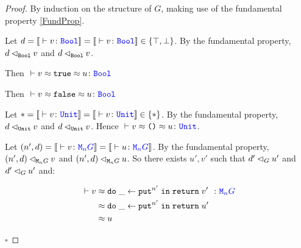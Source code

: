 \documentclass{Report}
\begin{document}
\begin{proof}
    By induction on the structure of $G$, making use of the fundamental property \ref{FundProp}.

    Let $d=\deno{\ztyperelation{v}{\B}}=\deno{\ztyperelation{v}{\B}}\in \{\top, \bot\}$. By the fundamental property, $d \lhd_{\texttt{Bool}} v$  and $d \lhd_{\texttt{Bool}} v$.

    Then $\zberelation{v\beequiv\t}{u}{\B}$

    
    Then $\zberelation{v\beequiv\f}{u}{\B}$

    Let $\singleton=\deno{\ztyperelation{v}{\U}}=\deno{\ztyperelation{v}{\U}}\in \{\singleton\}$. By the fundamental property, $d \lhd_{\texttt{Unit}} v$  and $d \lhd_{\texttt{Unit}} v$. Hence $\zberelation{v\beequiv\u}{u}{\U}$.

    \case{\teffect}

    Let $(n', d) = \deno{\ztyperelation{v}{\M{n}{G}}} = \deno{\ztyperelation{u}{\M{n}{G}}}$. By the fundamental property, $(n', d) \lhd_{\texttt{M}_{n}{G}} v$ and $(n', d) \lhd_{\texttt{M}_{n}{G}} u$. So there exists $u', v'$ such that $d' \lhd_{G} u'$ and $d' \lhd_{G} u'$ and:

    \begin{align}
        \zberelation{v&}{\doin{\_}{\put^{n'}}{\return{v'}}}{\M{n}{G}}\\
        &\beequiv \doin{\_}{\put^{n'}}{\return{u'}}\\
        & \beequiv u
    \end{align}

$\square$
\end{proof}
\end{document}
